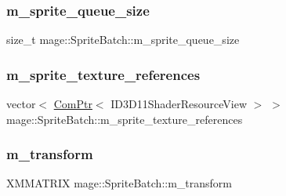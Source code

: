 \hypertarget{classmage_1_1_sprite_batch_a0d7dadf01e3b905072c1aaa6b8e42c0e}{}\label{classmage_1_1_sprite_batch_a0d7dadf01e3b905072c1aaa6b8e42c0e} 
\subsubsection{\texorpdfstring{m\+\_\+sprite\+\_\+queue\+\_\+size}{m\_sprite\_queue\_size}}
{\footnotesize\ttfamily size\+\_\+t mage\+::\+Sprite\+Batch\+::m\+\_\+sprite\+\_\+queue\+\_\+size\hspace{0.3cm}{\ttfamily [private]}}

\hypertarget{classmage_1_1_sprite_batch_ad8a5bb3b418c2cad84fecac0979a600c}{}\label{classmage_1_1_sprite_batch_ad8a5bb3b418c2cad84fecac0979a600c} 
\subsubsection{\texorpdfstring{m\+\_\+sprite\+\_\+texture\+\_\+references}{m\_sprite\_texture\_references}}
{\footnotesize\ttfamily vector$<$ \hyperlink{namespacemage_ae74f374780900893caa5555d1031fd79}{Com\+Ptr}$<$ I\+D3\+D11\+Shader\+Resource\+View $>$ $>$ mage\+::\+Sprite\+Batch\+::m\+\_\+sprite\+\_\+texture\+\_\+references\hspace{0.3cm}{\ttfamily [private]}}

\hypertarget{classmage_1_1_sprite_batch_ad8a12f1f6c8289548346d469c9436c58}{}\label{classmage_1_1_sprite_batch_ad8a12f1f6c8289548346d469c9436c58} 
\subsubsection{\texorpdfstring{m\+\_\+transform}{m\_transform}}
{\footnotesize\ttfamily X\+M\+M\+A\+T\+R\+IX mage\+::\+Sprite\+Batch\+::m\+\_\+transform\hspace{0.3cm}{\ttfamily [private]}}

